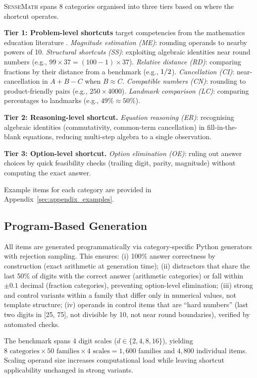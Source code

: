 \textsc{SenseMath} spans 8 categories organised into three tiers based on where the shortcut operates.

\textbf{Tier 1: Problem-level shortcuts} target competencies from the mathematics education literature \citep{mcintosh1992proposed,reys1991number}.
\emph{Magnitude estimation (ME)}: rounding operands to nearby powers of 10.
\emph{Structural shortcuts (SS)}: exploiting algebraic identities near round numbers (e.g., $99 \times 37 = (100{-}1) \times 37$).
\emph{Relative distance (RD)}: comparing fractions by their distance from a benchmark (e.g., $\nicefrac{1}{2}$).
\emph{Cancellation (CI)}: near-cancellation in $A + B - C$ when $B \approx C$.
\emph{Compatible numbers (CN)}: rounding to product-friendly pairs (e.g., $250 \times 4000$).
\emph{Landmark comparison (LC)}: comparing percentages to landmarks (e.g., $49\% \approx 50\%$).

\textbf{Tier 2: Reasoning-level shortcut.}
\emph{Equation reasoning (ER)}: recognising algebraic identities (commutativity, common-term cancellation) in fill-in-the-blank equations, reducing multi-step algebra to a single observation.

\textbf{Tier 3: Option-level shortcut.}
\emph{Option elimination (OE)}: ruling out answer choices by quick feasibility checks (trailing digit, parity, magnitude) without computing the exact answer.

Example items for each category are provided in Appendix~\ref{sec:appendix_examples}.

\subsection{Program-Based Generation}
\label{sec:generation}

All items are generated programmatically via category-specific Python generators with rejection sampling. This ensures:
(i) 100\% answer correctness by construction (exact arithmetic at generation time);
(ii) distractors that share the last 50\% of digits with the correct answer (arithmetic categories) or fall within $\pm 0.1$ decimal (fraction categories), preventing option-level elimination;
(iii) strong and control variants within a family that differ only in numerical values, not template structure;
(iv) operands in control items that are ``hard numbers'' (last two digits in [25, 75], not divisible by 10, not near round boundaries), verified by automated checks.

The benchmark spans 4 digit scales ($d \in \{2, 4, 8, 16\}$), yielding $8 \text{ categories} \times 50 \text{ families} \times 4 \text{ scales} = 1{,}600$ families and $4{,}800$ individual items.
Scaling operand size increases computational load while leaving shortcut applicability unchanged in strong variants.

